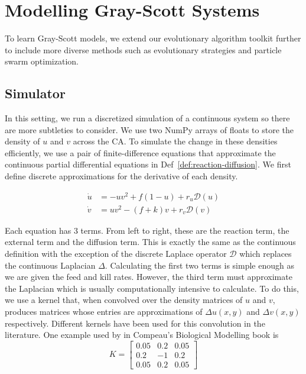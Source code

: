 \chapter{Modelling Gray-Scott Systems} \label{gray-scott}

To learn Gray-Scott models, we extend our evolutionary algorithm toolkit further to include more diverse methods such as evolutionary strategies and particle swarm optimization.

\section{Simulator} \label{subsec:simulator}

In this setting, we run a discretized simulation of a continuous system so there are more subtleties to consider. We use two NumPy arrays of floats to store the density of $u$ and $v$ across the CA. To simulate the change in these densities efficiently, we use a pair of finite-difference equations that approximate the continuous partial differential equations in Def~\ref{def:reaction-diffusion}. We first define discrete approximations for the derivative of each density.
\begin{definition}\label{def:gs}
\begin{align*}
  \dot{u} &= -uv^2 + f(1-u) + r_u \mathcal{D}(u)\\
  \dot{v} &= uv^2 - (f+k)v + r_v \mathcal{D}(v)
\end{align*}
\end{definition}
Each equation has 3 terms. From left to right, these are the reaction term, the external term and the diffusion term. This is exactly the same as the continuous definition with the exception of the discrete Laplace operator $\mathcal{D}$ which replaces the continuous Laplacian $\Delta$. Calculating the first two terms is simple enough as we are given the feed and kill rates.  However, the third term must approximate the Laplacian which is usually computationally intensive to calculate. To do this, we use a kernel that, when convolved over the density matrices of $u$ and $v$, produces matrices whose entries are approximations of $\Delta u(x,y)$ and $\Delta v(x,y)$ respectively. Different kernels have been used for this convolution in the literature. One example used by in Compeau's Biological Modelling book\cite{compeau} is
\[
  K= \begin{bmatrix}
    0.05 & 0.2 & 0.05\\
    0.2 & -1 & 0.2\\
    0.05 & 0.2 & 0.05
  \end{bmatrix}
\]
